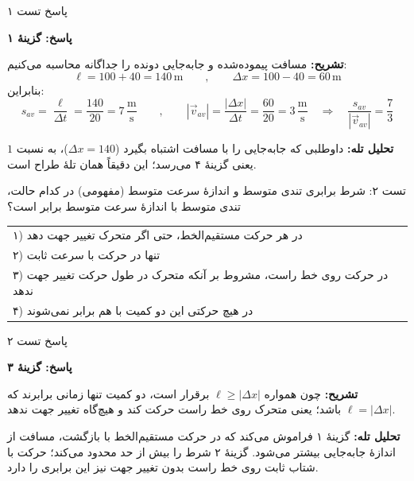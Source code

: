 \documentclass[12pt, a4paper]{article}
\begin{document}
\begin{answerbox}{پاسخ تست ۱}

\textbf{پاسخ: گزینهٔ ۱}

\textbf{تشریح:} مسافت پیموده‌شده و جابه‌جایی دونده را جداگانه محاسبه می‌کنیم:
\[
\ell = 100 + 40 = 140\,\text{m}
\qquad , \qquad
\Delta x = 100 - 40 = 60\,\text{m}
\]
بنابراین:
\[
s_{av} = \frac{\ell}{\Delta t} = \frac{140}{20} = 7\,\frac{\text{m}}{\text{s}}
\qquad , \qquad
|\vec{v}_{av}| = \frac{|\Delta x|}{\Delta t} = \frac{60}{20} = 3\,\frac{\text{m}}{\text{s}}
\quad \Longrightarrow \quad \frac{s_{av}}{|\vec{v}_{av}|} = \frac{7}{3}
\]

\textbf{تحلیل تله:} داوطلبی که جابه‌جایی را با مسافت اشتباه بگیرد ($\Delta x = 140$)، به نسبت $1$ یعنی گزینهٔ ۴ می‌رسد؛ این دقیقاً همان تلهٔ طراح است.
\end{answerbox}

\vspace{0.25cm}

\begin{exambox}{تست ۲: شرط برابری تندی متوسط و اندازهٔ سرعت متوسط (مفهومی)}
در کدام حالت، تندی متوسط با اندازهٔ سرعت متوسط برابر است؟

\begin{center}
\begin{tabular}{p{15cm}}
۱) در هر حرکت مستقیم‌الخط، حتی اگر متحرک تغییر جهت دهد \\
[0.2cm] ۲) تنها در حرکت با سرعت ثابت \\
[0.2cm] ۳) در حرکت روی خط راست، مشروط بر آنکه متحرک در طول حرکت تغییر جهت ندهد \\
[0.2cm] ۴) در هیچ حرکتی این دو کمیت با هم برابر نمی‌شوند \\
\end{tabular}
\end{center}
\end{exambox}

\begin{answerbox}{پاسخ تست ۲}

\textbf{پاسخ: گزینهٔ ۳}

\textbf{تشریح:} چون همواره $\ell \ge |\Delta x|$ برقرار است، دو کمیت تنها زمانی برابرند که $\ell = |\Delta x|$ باشد؛ یعنی متحرک روی خط راست حرکت کند و هیچ‌گاه تغییر جهت ندهد.

\textbf{تحلیل تله:} گزینهٔ ۱ فراموش می‌کند که در حرکت مستقیم‌الخط با بازگشت، مسافت از اندازهٔ جابه‌جایی بیشتر می‌شود. گزینهٔ ۲ شرط را بیش از حد محدود می‌کند؛ حرکت با شتاب ثابت روی خط راست بدون تغییر جهت نیز این برابری را دارد.
\end{answerbox}
\end{document}
